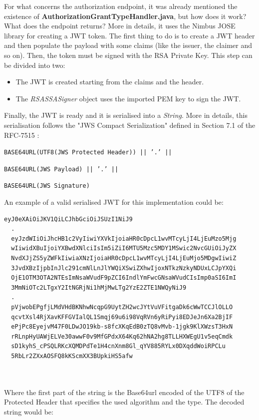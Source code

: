 \documentclass[a4paper,12pt]{article}
\def\rfc#1{RFC-#1\xspace}
\begin{document}
For what concerns the authorization endpoint, it was already mentioned the existence of \textbf{AuthorizationGrantTypeHandler.java}, but how does it work? What does the endpoint returns? More in details, it uses the Nimbus JOSE library for creating a JWT token. The first thing to do is to create a JWT header and then populate the payload with some claims (like the issuer, the claimer and so on). Then, the token must be signed with the RSA Private Key. This step can be divided into two: 

\begin{itemize}
    \item The JWT is created starting from the claims and the header.
    \item The \textit{RSASSASigner} object uses the imported PEM key to sign the JWT.
\end{itemize}

Finally, the JWT is ready and it is serialised into a \textit{String}. More in details, this serialisation follows the "JWS Compact Serialization" defined in Section 7.1 of the \rfc{7515} \cite{RFC7515}:

\quad \texttt{BASE64URL(UTF8(JWS Protected Header)) || '.' ||}
  
\quad \texttt{BASE64URL(JWS Payload) || '.' ||}
  
\quad \texttt{BASE64URL(JWS Signature)}

An example of a valid serialised JWT for this implementation could be:

\begin{lstlisting}[basicstyle=\ttfamily]
  eyJ0eXAiOiJKV1QiLCJhbGciOiJSUzI1NiJ9
  .
  eyJzdWIiOiJhcHB1c2VyIiwiYXVkIjoiaHR0cDpcL1wvMTcyLjI4LjEuMzo5Mjg
  wIiwidXBuIjoiYXBwdXNlciIsIm5iZiI6MTU5Mzc5MDY1MSwic2NvcGUiOiJyZX
  NvdXJjZS5yZWFkIiwiaXNzIjoiaHR0cDpcL1wvMTcyLjI4LjEuMjo5MDgwIiwiZ
  3JvdXBzIjpbInJlc291cmNlLnJlYWQiXSwiZXhwIjoxNTkzNzkyNDUxLCJpYXQi
  OjE1OTM3OTA2NTEsImNsaWVudF9pZCI6IndlYmFwcGNsaWVudCIsImp0aSI6ImI
  3MmNiOTc2LTgxY2ItNGRjNi1hMjMwLTg2YzE2ZTE1NWQyNiJ9
  .
  pVjwobEPgfjLMdVHdBKNhwNcqpG9UytZH2wcJYtVuVFitgaDk6cWwTCCJlOLLO
  qcvtXsl4RjXavKFFGVIalQL1Smqj69u6i98VqRVn6yRiPyi8EDJeJn6Xa2BjIF
  ePjPc8EyejvM47F0LDwJO19kb-s8fcXKqEdB0zTQ8vMvb-1jgk9KlXWzsT3HxN
  rRLnpHyUAWjELVe30awwF0v9MfGPdxX64Kq62hNA2hg8TLLHXWEgU1v5eqCmdk
  sD1kyhS_cPSQLRKcXQMDPdTe1H4cnXnm8Gl_qYV885RYLx0DXqddWoiRPCLu
  5RbLr2ZXxAOSFQ8kKScmXX3BUpkiHS5afw

  
\end{lstlisting}

Where the first part of the string is the Base64url encoded of the UTF8 of the Protected Header that specifies the used algorithm and the type. The decoded string would be:
\end{document}
